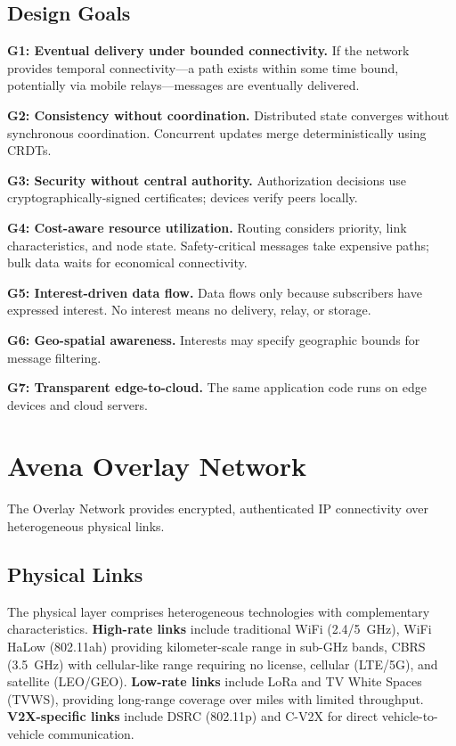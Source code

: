 \documentclass[journal]{IEEEtran}
\begin{document}
\subsection{Design Goals}

\textbf{G1: Eventual delivery under bounded connectivity.} If the network provides temporal connectivity---a path exists within some time bound, potentially via mobile relays---messages are eventually delivered.

\textbf{G2: Consistency without coordination.} Distributed state converges without synchronous coordination. Concurrent updates merge deterministically using CRDTs.

\textbf{G3: Security without central authority.} Authorization decisions use cryptographically-signed certificates; devices verify peers locally.

\textbf{G4: Cost-aware resource utilization.} Routing considers priority, link characteristics, and node state. Safety-critical messages take expensive paths; bulk data waits for economical connectivity.

\textbf{G5: Interest-driven data flow.} Data flows only because subscribers have expressed interest. No interest means no delivery, relay, or storage.

\textbf{G6: Geo-spatial awareness.} Interests may specify geographic bounds for message filtering.

\textbf{G7: Transparent edge-to-cloud.} The same application code runs on edge devices and cloud servers.


\section{Avena Overlay Network}
\label{sec:overlay}

The Overlay Network provides encrypted, authenticated IP connectivity over heterogeneous physical links.

\subsection{Physical Links}

The physical layer comprises heterogeneous technologies with complementary characteristics. \textbf{High-rate links} include traditional WiFi (2.4/5~GHz), WiFi HaLow (802.11ah) providing kilometer-scale range in sub-GHz bands, CBRS (3.5~GHz) with cellular-like range requiring no license, cellular (LTE/5G), and satellite (LEO/GEO). \textbf{Low-rate links} include LoRa and TV White Spaces (TVWS), providing long-range coverage over miles with limited throughput. \textbf{V2X-specific links} include DSRC (802.11p) and C-V2X for direct vehicle-to-vehicle communication.
\end{document}
